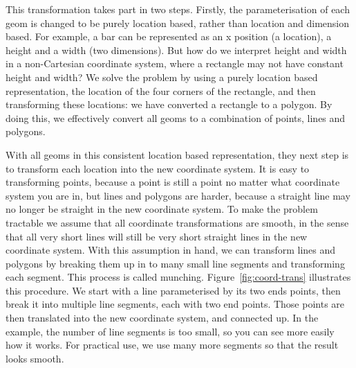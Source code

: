 This transformation takes part in two steps. Firstly, the parameterisation of each geom is changed to be purely location based, rather than location and dimension based. For example, a bar can be represented as an x position (a location), a height and a width (two dimensions). But how do we interpret height and width in a non-Cartesian coordinate system, where a rectangle may not have constant height and width? We solve the problem by using a purely location based representation, the location of the four corners of the rectangle, and then transforming these locations: we have converted a rectangle to a polygon. By doing this, we effectively convert all geoms to a combination of points, lines and polygons.

With all geoms in this consistent location based representation, they next step is to transform each location into the new coordinate system. It is easy to transforming points, because a point is still a point no matter what coordinate system you are in, but lines and polygons are harder, because a straight line may no longer be straight in the new coordinate system.  To make the problem tractable we assume that all coordinate transformations are smooth, in the sense that all very short lines will still be very short straight lines in the new coordinate system.  With this assumption in hand, we can transform lines and polygons by breaking them up in to many small line segments and transforming each segment. This process is called munching.  Figure~\ref{fig:coord-trans} illustrates this procedure.  We start with a line parameterised by its two ends points, then break it into multiple line segments, each with two end points.  Those points are then translated into the new coordinate system, and connected up.  In the example, the number of line segments is too small, so you can see more easily how it works.  For practical use, we use many more segments so that the result looks smooth.

% 
%
% 


